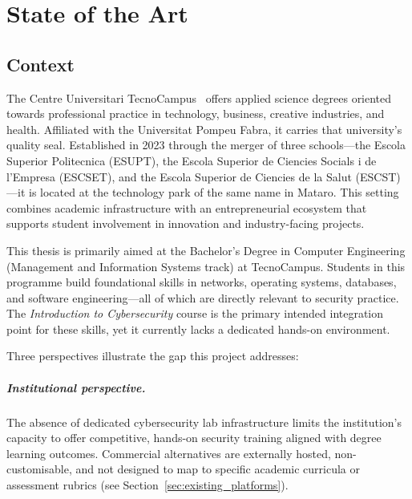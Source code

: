 
\chapter{State of the Art}

\section{Context}

The Centre Universitari TecnoCampus~\cite{tecnocampus} offers applied science degrees
oriented towards professional practice in technology, business, creative industries,
and health. Affiliated with the Universitat Pompeu Fabra, it carries that university's
quality seal. Established in 2023 through the merger of three schools---the Escola
Superior Politecnica (ESUPT), the Escola Superior de Ciencies Socials i de l'Empresa
(ESCSET), and the Escola Superior de Ciencies de la Salut (ESCST)---it is located
at the technology park of the same name in Mataro. This setting combines academic
infrastructure with an entrepreneurial ecosystem that supports student involvement in
innovation and industry-facing projects.

This thesis is primarily aimed at the Bachelor's Degree in Computer
Engineering (Management and Information Systems track) at TecnoCampus. Students in
this programme build foundational skills in networks, operating systems, databases,
and software engineering---all of which are directly relevant to security practice.
The \textit{Introduction to Cybersecurity} course is the primary intended
integration point for these skills, yet it currently lacks a dedicated hands-on environment.

Three perspectives illustrate the gap this project addresses:

\paragraph{Institutional perspective.}
The absence of dedicated cybersecurity lab infrastructure limits the institution's
capacity to offer competitive, hands-on security training aligned with degree learning
outcomes. Commercial alternatives are externally hosted, non-customisable, and not designed to map to specific academic curricula or
assessment rubrics (see Section~\ref{sec:existing_platforms}).

